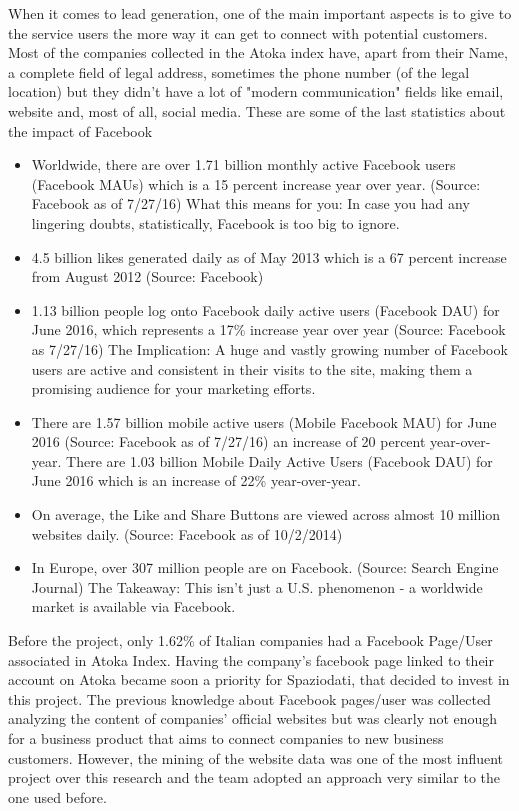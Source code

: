 When it comes to lead generation, one of the main important aspects is to give to the service users the more way it can get to connect with potential customers. Most of the companies collected in the Atoka index have, apart from their Name, a complete field of legal address, sometimes the phone number (of the legal location) but they didn't have a lot of "modern communication" fields like email, website and, most of all, social media. 
These are some of the last statistics about the impact of Facebook\cite{fbstats}
\begin{itemize}
\item Worldwide, there are over 1.71 billion monthly active Facebook users (Facebook MAUs) which is a 15 percent increase year over year. (Source: Facebook as of 7/27/16) What this means for you: In case you had any lingering doubts, statistically, Facebook is too big to ignore.
\item 4.5 billion likes generated daily as of May 2013 which is a 67 percent increase from August 2012 (Source: Facebook)
\item 1.13 billion people log onto Facebook daily active users (Facebook DAU) for June 2016, which represents a 17\% increase year over year (Source: Facebook as 7/27/16) The Implication: A huge and vastly growing number of Facebook users are active and consistent in their visits to the site, making them a promising audience for your marketing efforts.
\item There are 1.57 billion mobile active users (Mobile Facebook MAU) for June 2016 (Source: Facebook as of 7/27/16) an increase of 20 percent year-over-year.  There are 1.03 billion Mobile Daily Active Users (Facebook DAU) for June 2016 which is an increase of 22\% year-over-year.
\item On average, the Like and Share Buttons are viewed across almost 10 million websites daily. (Source: Facebook as of 10/2/2014)
\item In Europe, over 307 million people are on Facebook. (Source: Search Engine Journal) The Takeaway: This isn't just a U.S. phenomenon - a worldwide market is available via Facebook.
\end{itemize}

Before the project, only 1.62\% of Italian companies had a Facebook Page/User associated in Atoka Index.
Having the company's facebook page linked to their account on Atoka became soon a priority for Spaziodati, that decided to invest in this project. The previous knowledge about Facebook pages/user was collected analyzing the content of companies' official websites but was clearly not enough for a business product that aims to connect companies to new business customers. However, the mining of the website data was one of the most influent project over this research and the team adopted an approach very similar to the one used before.


